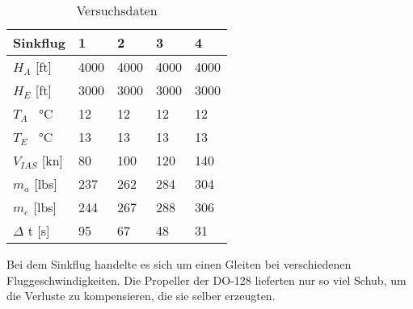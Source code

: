 \begin{table}[H]
	\centering
	\begin{tabular}{| l | l | l | l | l | }
\hline
	Sinkflug & 1 & 2 & 3 & 4 \\ \hline
	$H_A$ [ft] & 4000 & 4000 & 4000 & 4000 \\ \hline
	$H_E$ [ft]  & 3000 & 3000 & 3000 & 3000 \\ \hline
	$T_A$  \SI{}{\celsius} & 12 & 12 & 12 & 12 \\ \hline
	$T_E$  \SI{}{\celsius} & 13 & 13 & 13 & 13 \\ \hline
	$V_{IAS}$ [kn] & 80 & 100 & 120 & 140 \\ \hline
	$m_a$ [lbs] & 237 & 262 & 284 & 304 \\ \hline
	$m_e$ [lbs] & 244 & 267 & 288 & 306 \\ \hline
	$\Delta$ t [s] & 95 & 67 & 48 & 31 \\ \hline
\end{tabular}
	\caption{Versuchsdaten}
	\label{tab:VersuchDaten2}
\end{table}

Bei dem Sinkflug handelte es sich um einen Gleiten bei verschiedenen Fluggeschwindigkeiten. Die Propeller der DO-128 lieferten nur so viel Schub, um  die Verluste zu kompensieren, die sie selber erzeugten.
